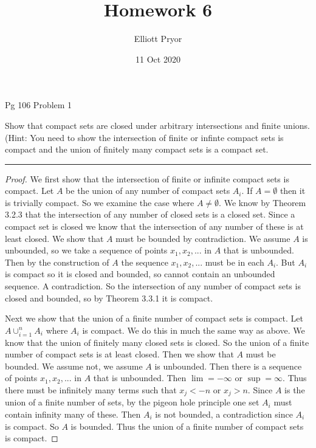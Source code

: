 \documentclass[11pt]{article}
\title{Homework 6}
\author{Elliott Pryor}
\date{11 Oct 2020}
\begin{document}
\maketitle

 Pg 106 Problem 1

Show that compact sets are closed under arbitrary intersections and finite unions. 
(Hint: You need to show the intersection of finite or infinte compact sets is compact and the union of finitely many compact sets is a compact set.

\hrule


\begin{proof}

We first show that the intersection of finite or infinite compact sets is compact. Let $A$ be the union of any number of compact sets $A_i$.
If $A = \emptyset$ then it is trivially compact. 
So we examine the case where $A \neq \emptyset$. We know by Theorem 3.2.3 that the intersection of any number of closed sets is a closed set. Since a compact set is closed we know that the intersection of any number of these is at least closed.
We show that $A$ must be bounded by contradiction. We assume $A$ is unbounded, so we take a sequence of points $x_1, x_2, ...$ in $A$ that is unbounded. 
Then by the construction of $A$ the sequence $x_1, x_2, ...$ must be in each $A_i$. But $A_i$ is compact so it is closed and bounded, so cannot contain an unbounded sequence. A contradiction. 
So the intersection of any number of compact sets is closed and bounded, so by Theorem 3.3.1 it is compact.

Next we show that the union of a finite number of compact sets is compact. Let $A \cup_{i=1}^n A_i$ where $A_i$ is compact. We do this in much the same way as above.
We know that the union of finitely many closed sets is closed. So the union of a finite number of compact sets is at least closed. 
Then we show that $A$ must be bounded. We assume not, we assume $A$ is unbounded. Then there is a sequence of points $x_1, x_2, ...$ in $A$ that is unbounded. Then $\lim = -\infty$ or $\sup = \infty$. 
Thus there must be infinitely many terms such that $x_j < -n$ or $x_j > n$. Since $A$ is the union of a finite number of sets, by the pigeon hole principle one set $A_i$ must contain infinity many of these. Then $A_i$ is not bounded, a contradiction since $A_i$ is compact. So $A$ is bounded. 
Thus the union of a finite number of compact sets is compact.

\end{proof}
\end{document}
